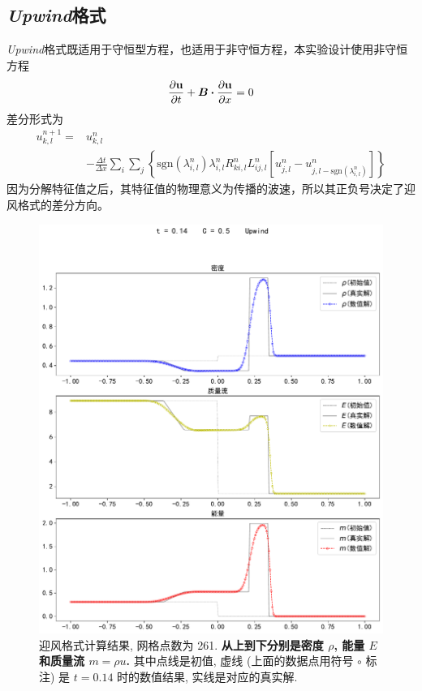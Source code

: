 \documentclass[10.5pt
]{article}
\begin{document}
\subsection{\textit{Upwind}格式}
\textit{Upwind}格式既适用于守恒型方程，也适用于非守恒方程，本实验设计使用非守恒方程
\begin{align}
\pdv{\vb u}{t} + \vb*B \vdot \pdv{\vb u}{x} = 0
\end{align}
差分形式为
\begin{align}
u_{k,l}^{n+1} =& u_{k,l}^n \nonumber\\
& - \frac{\Delta t}{\Delta x} \sum_i \sum_j \left\{\text{sgn}(\lambda_{i,l}^n)
 \lambda_{i,l}^n R_{ki,l}^n L_{ij,l}^n \left[u_{j,l}^n - u_{j,l-\text{sgn}(\lambda_{i,l}^n)}^n\right]\right\}
\end{align}
因为分解特征值之后，其特征值的物理意义为传播的波速，所以其正负号决定了迎风格式的差分方向。

\begin{figure}
\begin{center}
\includegraphics[width=.85\textwidth]{figures/upwind261.pdf}
\caption{迎风格式计算结果, 网格点数为 261. \textbf{从上到下分别是密度 $\rho$, 能量 $E$ 和质量流 $m = \rho u$.}
其中点线是初值, 虚线 (上面的数据点用符号 $\circ$ 标注) 是 $t=0.14$ 时的数值结果, 实线是对应的真实解.}\label{fig:Upwind}
\end{center}
\end{figure}
\end{document}
